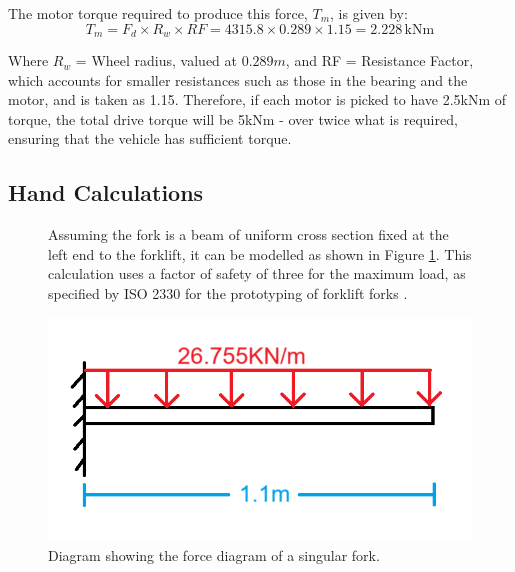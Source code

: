 \documentclass[12pt]{article}
\begin{document}
The motor torque required to produce this force, $T_m$, is given by:
\vspace{-20pt}
\begin{equation}
    T_m = F_d \times R_w \times RF = 4315.8 \times 0.289 \times 1.15 = 2.228 \, \text{kNm}
\end{equation}
\vspace{-40pt}

Where $R_w$ = Wheel radius, valued at $0.289m$, and RF = Resistance Factor, which accounts for smaller resistances such as those in the bearing and the motor, and is taken as 1.15. Therefore, if each motor is picked to have 2.5kNm of torque, the total drive torque will be 5kNm - over twice what is required, ensuring that the vehicle has sufficient torque.






\subsection {Hand Calculations}
\begin{figure}[H]
    \centering
    \begin{minipage}[t]{0.5\textwidth}
        \vspace{0pt}
        \linespread{1.5}
        Assuming the fork is a beam of uniform cross section fixed at the left end to the forklift, it can be modelled as shown in Figure \ref{fig:x}. This calculation uses a factor of safety of three for the maximum load, as specified by ISO 2330 for the prototyping of forklift forks \cite{iso2330}.
    \end{minipage}%
    \hfill
    \begin{minipage}[t]{0.45\textwidth}
        \vspace{-32pt} 
        \centering
        \includegraphics[width=\linewidth]{fork as a beam diagram.png}
        \vspace{-40pt}
        \caption{Diagram showing the force diagram of a singular fork.}
        \label{fig:x}
    \end{minipage}
\end{figure}
\end{document}
